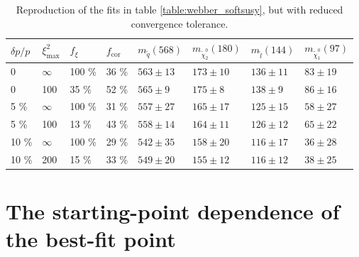 \documentclass[twoside,english]{uiofysmaster}
\begin{document}
\begin{table}[hbt]
	\centering
	\begin{tabular}{| l | l | l | l  || l | l | l | l |}
		\hline
		$\delta p/p$ & $\xi^2_\mathrm{max}$ & $f_\xi$ & $f_\mathrm{cor}$ & $m_{\tilde q} (568)$ & $m_{\tilde \chi_2^0} (180)$ & $m_{\tilde l} (144)$ & $m_{\tilde \chi_1^0} (97)$ \\
		\hline \hline
		0 & 	$\infty$ &	100 \%	& 36 \%	& $563 \pm 13$	&	$173 \pm 10$	&	$136 \pm 11$	& 	$83 \pm 19$	\\
		0 &		100 &		35 \%	& 52 \% & $565 \pm 9$	&	$175 \pm 8$		&	$138 \pm 9$	&	$86 \pm 16$	\\
		5 \% &	$\infty$ &	100 \%	& 31 \% & $557 \pm 27$	& 	$165 \pm 17$	&	$125 \pm 15$&	$58 \pm 27$ \\
		5 \% &	100 &		13 \%	& 43 \% & $558 \pm 14$	&	$164 \pm 11$	& 	$126 \pm 12$	&	$65 \pm 22$	\\
		10 \% &	$\infty$ &	100 \%	& 29 \% & $542 \pm 35$	&	$158 \pm 20$	&	$116 \pm 17$&	$36 \pm 28$	\\
		10 \% &	200 &		15 \%	& 33 \% & $549 \pm 20$	& 	$155 \pm 12$	&	$116 \pm 12$&	$38 \pm 25$ \\
		\hline
	\end{tabular}
	\caption{Reproduction of the fits in table \ref{table:webber_softsusy}, but with reduced convergence tolerance.}
	\label{table:webber_rec_lowtol}
\end{table}

\section{The starting-point dependence of the best-fit point}
\label{sec:SP-dependence_webber}
\end{document}
